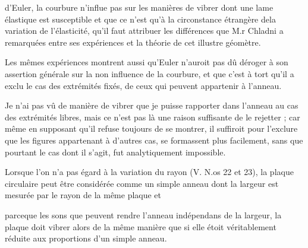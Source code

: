 \documentclass[11pt,a4paper]{article}
\begin{document}
d'Euler, la courbure n'influe pas sur les manières de vibrer dont
une lame élastique est susceptible et que ce n'est qu'à la circonstance
étrangère dela variation de l'élasticité, qu'il faut attribuer
les différences que M.r Chladni a remarquées entre ses
expériences et la théorie de cet illustre géomètre.

Les mêmes expériences montrent aussi qu'Euler n'auroit
pas dû déroger à son assertion générale sur la non
influence de la courbure, et que c'est à tort qu'il a
exclu le cas des extrémités  fixés, de ceux
qui peuvent appartenir à l'anneau.

Je n'ai pas vû de manière de vibrer que je
puisse rapporter dans l'anneau au cas des extrémités
libres, mais ce n'est pas là une raison suffisante de le
rejetter ; car même en supposant qu'il refuse toujours
de se montrer, il suffiroit pour l'exclure que les
figures appartenant à d'autres cas, se formassent plus
facilement, sans que pourtant le cas dont il s'agit, fut
analytiquement impossible.

Lorsque l'on  n'a pas égard à la variation du 
rayon  (V. N.os 22 et 23), la plaque circulaire
peut être considérée comme un simple anneau dont la
largeur est mesurée par le rayon de la même plaque et



parceque les sons que peuvent rendre  l'anneau 
indépendans de  la largeur, la plaque doit vibrer alors
de la même manière que si elle étoit véritablement
réduite aux proportions d'un simple anneau.
\end{document}
